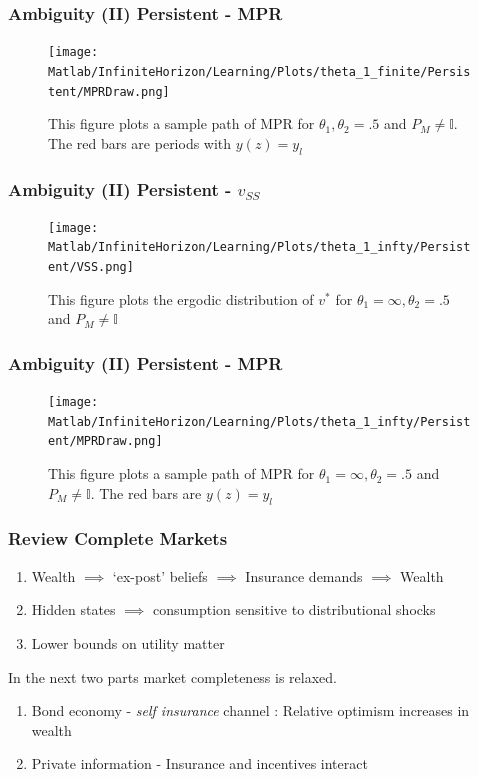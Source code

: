 \documentclass{beamer}
\theoremstyle{definition}
\begin{document}
%
\begin{frame}
\frametitle{Ambiguity (II) Persistent - MPR}
\begin{figure}[htbp]
\centering
	  \texttt{[image: Matlab/InfiniteHorizon/Learning/Plots/theta\_1\_finite/Persistent/MPRDraw.png]}
%
	\caption{\small {This figure plots a sample path of MPR for $\theta_1,\theta_2 =.5$ and $P_M \neq \mathbb{I}$}. The red bars are periods with $y(z)=y_l$}
	
	\label{fig:MPR_theta_1_finite_persistent}
	\end{figure}
\end{frame}

\begin{frame}
\frametitle{Ambiguity (II) Persistent - $v_{SS}$}
\begin{figure}[htbp]
\centering
	  \texttt{[image: Matlab/InfiniteHorizon/Learning/Plots/theta\_1\_infty/Persistent/VSS.png]}
%
	\caption{\small {This figure plots the ergodic distribution of $v^*$ for $\theta_1=\infty,\theta_2 =.5$ and $P_M \neq \mathbb{I}$}}
	
	\label{fig:VSS_theta_1_infty_persistent}
\end{figure}
\end{frame}
%
%
\begin{frame}
\frametitle{Ambiguity (II) Persistent - MPR}
\begin{figure}[htbp]
\centering
	  \texttt{[image: Matlab/InfiniteHorizon/Learning/Plots/theta\_1\_infty/Persistent/MPRDraw.png]}

	\caption{\small {This figure plots a sample path of MPR for $\theta_1=\infty,\theta_2 =.5$ and $P_M \neq \mathbb{I}$. The red bars are $y(z)=y_l$}}
%	
	\label{fig:MPR_theta_1_infty_persistent}
	\end{figure}
\end{frame}
\begin{frame}
\frametitle{Review Complete Markets}
\begin{enumerate}
	\item Wealth $\implies$ `ex-post' beliefs $\implies$ Insurance demands $\implies$ Wealth 
	\item Hidden states $\implies$ consumption sensitive to distributional shocks
	\item Lower bounds on utility matter 
\end{enumerate}
In the next two parts market completeness is relaxed. 
\begin{enumerate}
	\item Bond economy - \emph{self insurance} channel : Relative optimism increases in wealth
	\item Private information - Insurance and incentives interact
\end{enumerate}
\end{frame}
\end{document}
